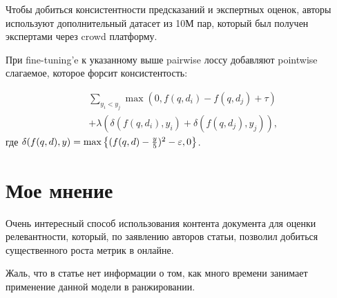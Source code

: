 Чтобы добиться консистентности предсказаний и экспертных оценок, авторы используют дополнительный датасет из 10М пар, который был получен экспертами через crowd платформу.

При fine-tuning'e к указанному выше pairwise лоссу добавляют pointwise слагаемое, которое форсит консистентость:

\begin{align*}
    & \sum\limits_{y_i < y_j} \max (0, f(q, d_i) - f(q, d_j) + \tau) \\
    & + \lambda \left(\delta (f(q, d_i), y_i) + \delta (f(q, d_j), y_j)\right),
\end{align*}
где $\delta (f(q, d), y) = \max \left\{ (f(q, d) - \frac{y}{5})^2 - \varepsilon , 0 \right\} $.

\section*{Мое мнение}

Очень интересный способ использования контента документа для оценки релевантности, который, по заявлению авторов статьи, позволил добиться существенного роста метрик в онлайне.

Жаль, что в статье нет информации о том, как много времени занимает применение данной модели в ранжировании.